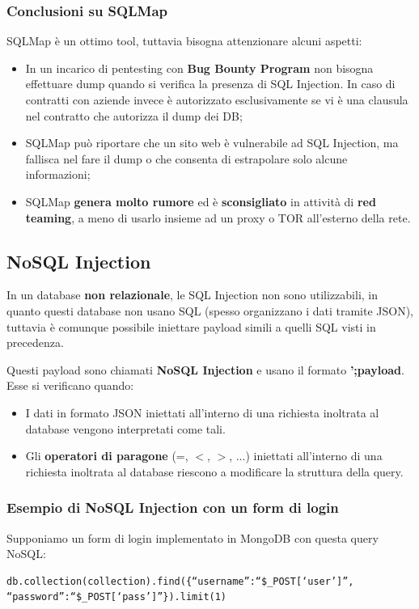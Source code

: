 \documentclass{article}
\begin{document}
\subsubsection{Conclusioni su SQLMap}
SQLMap è un ottimo tool, tuttavia bisogna attenzionare alcuni aspetti:
\begin{itemize}
	\item In un incarico di pentesting con \textbf{Bug Bounty Program} non bisogna effettuare dump quando si verifica la presenza di SQL Injection. In caso di contratti con aziende invece è autorizzato esclusivamente se vi è una clausula nel contratto che autorizza il dump dei DB;
	
	\item SQLMap può riportare che un sito web è vulnerabile ad SQL Injection, ma fallisca nel fare il dump o che consenta di estrapolare solo alcune informazioni; 
	
	\item SQLMap \textbf{genera molto rumore} ed è \textbf{sconsigliato} in attività di \textbf{red teaming}, a meno di usarlo insieme ad un proxy o TOR all'esterno della rete.
\end{itemize}

\subsection{NoSQL Injection}
In un database \textbf{non relazionale}, le SQL Injection non sono utilizzabili, in quanto questi database non usano SQL (spesso organizzano i dati tramite JSON), tuttavia è comunque possibile iniettare payload simili a quelli SQL visti in precedenza.

Questi payload sono chiamati \textbf{NoSQL Injection} e usano il formato \textbf{';payload}. Esse si verificano quando:
\begin{itemize}
	\item I dati in formato JSON iniettati all’interno di una richiesta inoltrata al database vengono interpretati come tali.
	
	\item Gli \textbf{operatori di paragone} (=, $<$, $>$, ...) iniettati all’interno di una richiesta inoltrata al database riescono a modificare la struttura della query.
\end{itemize}

\subsubsection{Esempio di NoSQL Injection con un form di login}
Supponiamo un form di login implementato in MongoDB con questa query NoSQL:
\begin{verbatim}
db.collection(collection).find({“username”:“$_POST[‘user’]”,
“password”:“$_POST[‘pass’]”}).limit(1)
\end{verbatim}
\end{document}

